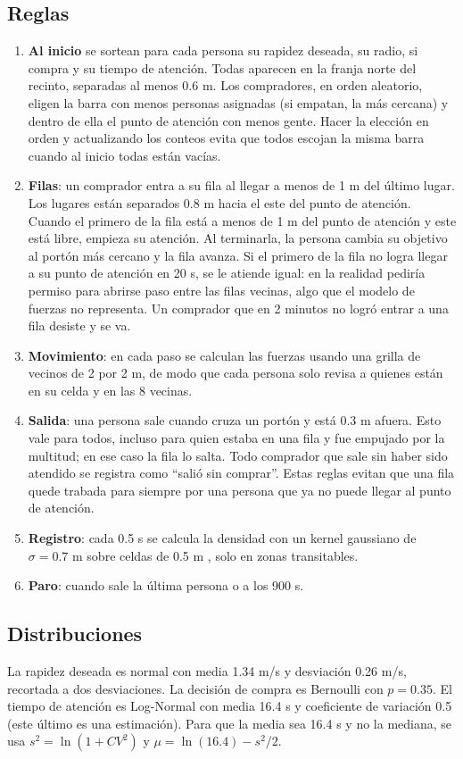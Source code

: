\documentclass[11pt,letterpaper]{article}
\begin{document}
\subsection{Reglas}
\begin{enumerate}
\item \textbf{Al inicio} se sortean para cada persona su rapidez deseada, su radio, si compra y su tiempo de atención. Todas aparecen en la franja norte del recinto, separadas al menos 0.6 m. Los compradores, en orden aleatorio, eligen la barra con menos personas asignadas (si empatan, la más cercana) y dentro de ella el punto de atención con menos gente. Hacer la elección en orden y actualizando los conteos evita que todos escojan la misma barra cuando al inicio todas están vacías.
\item \textbf{Filas}: un comprador entra a su fila al llegar a menos de 1 m del último lugar. Los lugares están separados 0.8 m hacia el este del punto de atención. Cuando el primero de la fila está a menos de 1 m del punto de atención y este está libre, empieza su atención. Al terminarla, la persona cambia su objetivo al portón más cercano y la fila avanza. Si el primero de la fila no logra llegar a su punto de atención en 20 s, se le atiende igual: en la realidad pediría permiso para abrirse paso entre las filas vecinas, algo que el modelo de fuerzas no representa. Un comprador que en 2 minutos no logró entrar a una fila desiste y se va.
\item \textbf{Movimiento}: en cada paso se calculan las fuerzas usando una grilla de vecinos de 2 por 2 m, de modo que cada persona solo revisa a quienes están en su celda y en las 8 vecinas.
\item \textbf{Salida}: una persona sale cuando cruza un portón y está 0.3 m afuera. Esto vale para todos, incluso para quien estaba en una fila y fue empujado por la multitud; en ese caso la fila lo salta. Todo comprador que sale sin haber sido atendido se registra como ``salió sin comprar''. Estas reglas evitan que una fila quede trabada para siempre por una persona que ya no puede llegar al punto de atención.
\item \textbf{Registro}: cada 0.5 s se calcula la densidad con un kernel gaussiano de $\sigma = 0.7$ m sobre celdas de 0.5 m \citep{helbing2007}, solo en zonas transitables.
\item \textbf{Paro}: cuando sale la última persona o a los 900 s.
\end{enumerate}

\subsection{Distribuciones}
La rapidez deseada es normal con media 1.34 m/s y desviación 0.26 m/s, recortada a dos desviaciones. La decisión de compra es Bernoulli con $p = 0.35$. El tiempo de atención es Log-Normal con media 16.4 s y coeficiente de variación 0.5 (este último es una estimación). Para que la media sea 16.4 s y no la mediana, se usa $s^2 = \ln(1 + CV^2)$ y $\mu = \ln(16.4) - s^2/2$.
\end{document}
